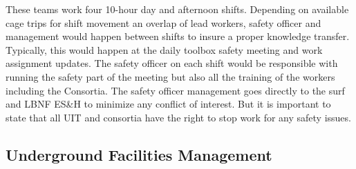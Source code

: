 These teams work four 10-hour day and afternoon shifts.  Depending on
available cage trips for shift movement an overlap of lead workers,
safety officer and management would happen between shifts to insure a
proper knowledge transfer.  Typically, this would happen at the daily
toolbox safety meeting and work assignment updates.  The safety
officer on each shift would be responsible with running the safety
part of the meeting but also all the training of the workers including
the Consortia. The safety officer management goes directly to the {surf}
and LBNF ES\&H to minimize any conflict of interest.  But it is
important to state that all UIT and consortia have the right to stop
work for any safety issues.

\subsection{Underground Facilities Management}

